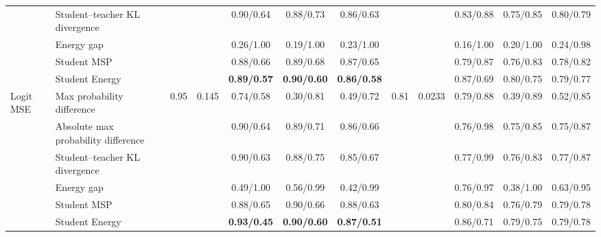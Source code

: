 \documentclass[border=2pt]{standalone}
\begin{document}
\begin{tabular}{llcccccccccc}
 & Student--teacher KL divergence &  &  & 0.90/0.64 & 0.88/0.73 & 0.86/0.63 &  &  & 0.83/0.88 & 0.75/0.85 & 0.80/0.79 \\
 & Energy gap &  &  & 0.26/1.00 & 0.19/1.00 & 0.23/1.00 &  &  & 0.16/1.00 & 0.20/1.00 & 0.24/0.98 \\
 & Student MSP &  &  & 0.88/0.66 & 0.89/0.68 & 0.87/0.65 &  &  & 0.79/0.87 & 0.76/0.83 & 0.78/0.82 \\
 & Student Energy &  &  & \textbf{0.89/0.57} & \textbf{0.90/0.60} & \textbf{0.86/0.58} &  &  & 0.87/0.69 & 0.80/0.75 & 0.79/0.77 \\
\addlinespace
Logit MSE & Max probability difference & 0.95 & 0.145 & 0.74/0.58 & 0.30/0.81 & 0.49/0.72 & 0.81 & 0.0233 & 0.79/0.88 & 0.39/0.89 & 0.52/0.85 \\
 & Absolute max probability difference &  &  & 0.90/0.64 & 0.89/0.71 & 0.86/0.66 &  &  & 0.76/0.98 & 0.75/0.85 & 0.75/0.87 \\
 & Student--teacher KL divergence &  &  & 0.90/0.63 & 0.88/0.75 & 0.85/0.67 &  &  & 0.77/0.99 & 0.76/0.83 & 0.77/0.87 \\
 & Energy gap &  &  & 0.49/1.00 & 0.56/0.99 & 0.42/0.99 &  &  & 0.76/0.97 & 0.38/1.00 & 0.63/0.95 \\
 & Student MSP &  &  & 0.88/0.65 & 0.90/0.66 & 0.88/0.63 &  &  & 0.80/0.84 & 0.76/0.79 & 0.79/0.78 \\
 & Student Energy &  &  & \textbf{0.93/0.45} & \textbf{0.90/0.60} & \textbf{0.87/0.51} &  &  & 0.86/0.71 & 0.79/0.75 & 0.79/0.78 \\
\bottomrule
\end{tabular}
\end{document}
